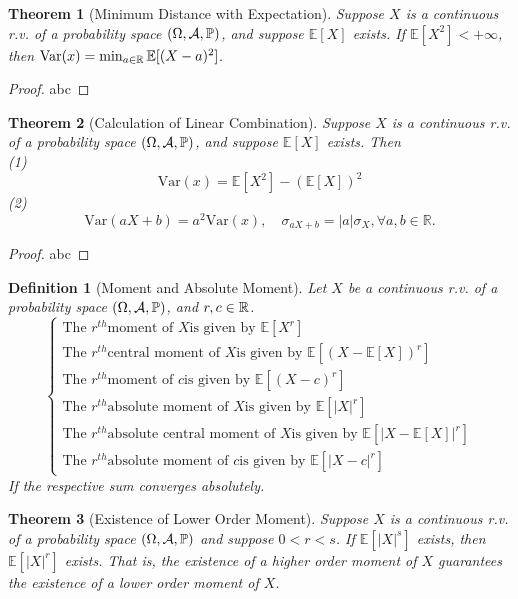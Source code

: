 \documentclass[openany,12pt]{book}
\newtheorem{theorem}{Theorem}[chapter]
\newtheorem{definition}{Definition}[chapter]
\begin{document}
\begin{theorem}[Minimum Distance with Expectation]
  Suppose $X$ is a continuous r.v. of a probability space $(\Omega,\mathcal{A},\mathbb{P})$, and suppose $\mathbb{E}[X]$ exists. If $\mathbb{E}\left[X^2\right]<+\infty$, then $\mathrm{Var}(x)=\min_{a\in\mathbb{R}}\mathbb{E}[(X-a)^2]$.
\end{theorem}

\begin{proof}
  abc
\end{proof}

\begin{theorem}[Calculation of Linear Combination]
  Suppose $X$ is a continuous r.v. of a probability space $(\Omega,\mathcal{A},\mathbb{P})$, and suppose $\mathbb{E}[X]$ exists. Then\\
  (1)
  $$
    \mathrm{Var}(x)=\mathbb{E}\left[X^2\right]-(\mathbb{E}[X])^2
  $$
  (2)
  $$
    \mathrm{Var}(aX+b)=a^2\mathrm{Var}(x),\quad
    \sigma_{aX+b}=\left|a\right|\sigma_X, \forall a,b\in\mathbb{R}.
  $$
\end{theorem}

\begin{proof}
  abc
\end{proof}

\begin{definition}[Moment and Absolute Moment]
  Let $X$ be a continuous r.v. of a probability space $(\Omega,\mathcal{A},\mathbb{P})$, and $r,c\in\mathbb{R}$.
  $$\left\{
    \begin{array}{l}
      \text{The }r^{th} \text{moment of } X \text{is given by } \mathbb{E}[X^r]   \\
      \text{The }r^{th} \text{central moment of } X \text{is given by } \mathbb{E}[(X-\mathbb{E}[X])^r]           \\
      \text{The }r^{th} \text{moment of } c \text{is given by } \mathbb{E}[(X-c)^r]      \\
      \text{The }r^{th} \text{absolute moment of } X \text{is given by } \mathbb{E}[|X|^r]                        \\
      \text{The }r^{th} \text{absolute central moment of } X \text{is given by } \mathbb{E}[|X-\mathbb{E}[X] |^r] \\
      \text{The } r^{th} \text{absolute moment of } c \text{is given by } \mathbb{E}[|X-c|^r]
    \end{array}
    \right.$$
  If the respective sum converges absolutely.
\end{definition}

\begin{theorem}[Existence of Lower Order Moment]
  Suppose $X$ is a continuous r.v. of a probability space $(\Omega,\mathcal{A},\mathbb{P})$ and suppose $0<r<s$. If $\mathbb{E}[|X|^s]$ exists, then $\mathbb{E}[|X|^r]$ exists. That is, the existence of a higher order moment of $X$ guarantees the existence of a lower order moment of $X$.
\end{theorem}
\end{document}
